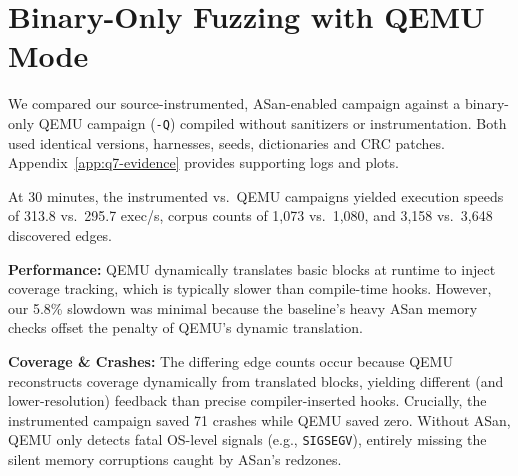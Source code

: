 \section{Binary-Only Fuzzing with QEMU Mode}

We compared our source-instrumented, ASan-enabled campaign against a binary-only QEMU campaign (\texttt{-Q}) compiled without sanitizers or instrumentation. Both used identical versions, harnesses, seeds, dictionaries and CRC patches. Appendix~\ref{app:q7-evidence} provides supporting logs and plots.

At 30 minutes, the instrumented vs.\ QEMU campaigns yielded execution speeds of 313.8 vs.\ 295.7 exec/s, corpus counts of 1,073 vs.\ 1,080, and 3,158 vs.\ 3,648 discovered edges.

\textbf{Performance:} QEMU dynamically translates basic blocks at runtime to inject coverage tracking, which is typically slower than compile-time hooks. However, our 5.8\% slowdown was minimal because the baseline's heavy ASan memory checks offset the penalty of QEMU's dynamic translation.

\textbf{Coverage \& Crashes:} The differing edge counts occur because QEMU reconstructs coverage dynamically from translated blocks, yielding different (and lower-resolution) feedback than precise compiler-inserted hooks. Crucially, the instrumented campaign saved 71 crashes while QEMU saved zero. Without ASan, QEMU only detects fatal OS-level signals (e.g., \texttt{SIGSEGV}), entirely missing the silent memory corruptions caught by ASan's redzones.




